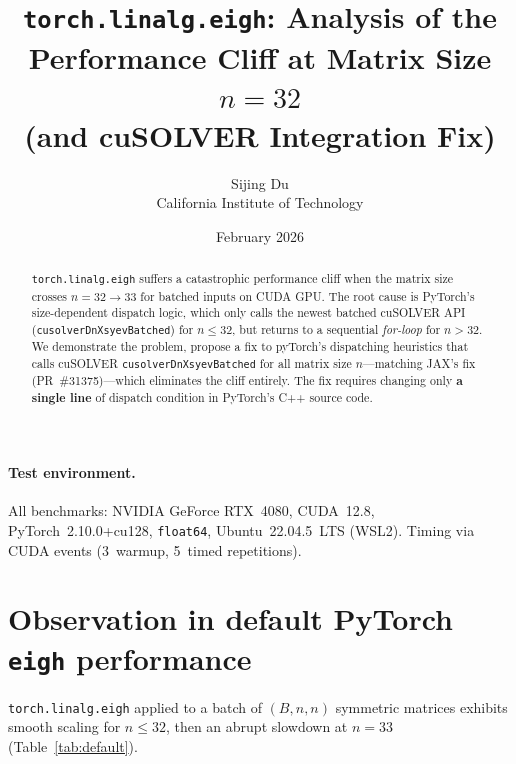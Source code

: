 \documentclass[10pt, letterpaper]{article}
\title{\vspace{-1cm} \textbf{\texttt{torch.linalg.eigh}: Analysis of the Performance Cliff at Matrix Size $n=32$} \\ 
      \large (and cuSOLVER Integration Fix)}
\author{Sijing Du \\ \small California Institute of Technology}
\date{February 2026}
\begin{document}
\maketitle

\begin{abstract}
\texttt{torch.linalg.eigh} suffers a catastrophic performance
cliff when the matrix size crosses $n = 32 \to 33$ for batched inputs
on CUDA GPU. The root cause is PyTorch's size-dependent dispatch logic, which only calls
the newest batched cuSOLVER API (\texttt{cusolverDnXsyevBatched}) for
$n \le 32$, but returns to a sequential \textit{for-loop} for $n>32$. We demonstrate the problem, propose a fix to pyTorch's dispatching heuristics that calls cuSOLVER \texttt{cusolverDnXsyevBatched} for all matrix size $n$---matching
JAX's fix (PR~\#31375)---which eliminates the cliff entirely. The fix requires changing only \textbf{a single line} of
dispatch condition in PyTorch's C++ source code.
\end{abstract}

\paragraph{Test environment.}
All benchmarks: NVIDIA GeForce RTX~4080, CUDA~12.8,
PyTorch~2.10.0+cu128, \texttt{float64}, Ubuntu~22.04.5~LTS (WSL2).
Timing via CUDA events (3~warmup, 5~timed repetitions).


\section{Observation in default PyTorch \texttt{eigh} performance}
\label{sec:observation}

\texttt{torch.linalg.eigh} applied to a batch of $(B, n, n)$ symmetric
matrices exhibits smooth scaling for $n \le 32$, then an abrupt
slowdown at $n = 33$ (Table~\ref{tab:default}).
\end{document}

